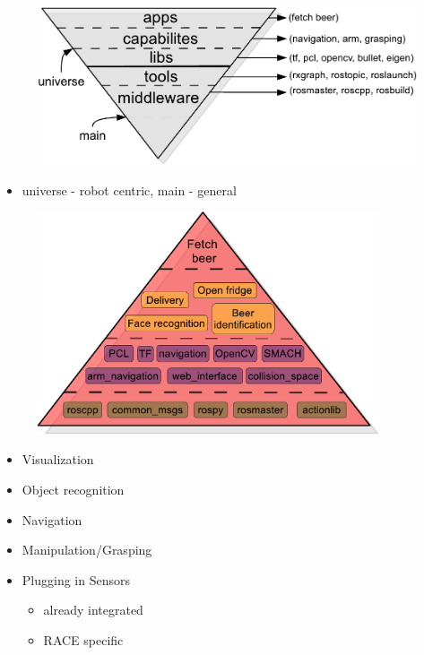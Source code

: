 \noindent \begin{center}
\begin{figure}[H]
\noindent \centering{}\includegraphics[width=1\textwidth]{images/ROSEcosystem}
\end{figure}

\par\end{center}
\begin{itemize}
\item universe - robot centric, main - general
\end{itemize}
\noindent \begin{center}
\begin{figure}[H]
\noindent \centering{}\includegraphics[width=0.9\textwidth]{images/ROSFetchBeer}
\end{figure}

\par\end{center}


\lyxframeend{}


\lyxframeend{}
\begin{itemize}
\item Visualization
\item Object recognition
\item Navigation
\item Manipulation/Grasping
\item Plugging in Sensors

\begin{itemize}
\item already integrated
\item RACE specific
\end{itemize}
\end{itemize}

\lyxframeend{}
